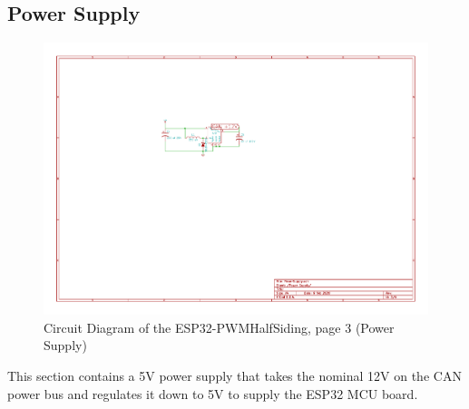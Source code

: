 \subsection{Power Supply}
\begin{figure}[hbpt]\begin{centering}%
\includegraphics[width=5in]{ESP32-PWMHalfSiding-3.pdf}
\caption{Circuit Diagram of the ESP32-PWMHalfSiding, page 3 (Power Supply)}
\end{centering}\end{figure}

This section contains a 5V power supply that takes the nominal 12V on the CAN 
power bus and regulates it down to 5V to supply the ESP32 MCU board.

\clearpage
